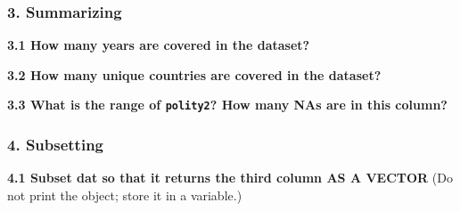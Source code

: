 \documentclass[]{book}
\newenvironment{Shaded}{\begin{snugshade}}{\end{snugshade}}
\newcommand{\CommentTok}[1]{\textcolor[rgb]{0.56,0.35,0.01}{\textit{#1}}}
\newcommand{\DecValTok}[1]{\textcolor[rgb]{0.00,0.00,0.81}{#1}}
\newcommand{\KeywordTok}[1]{\textcolor[rgb]{0.13,0.29,0.53}{\textbf{#1}}}
\newcommand{\NormalTok}[1]{#1}
\newcommand{\OperatorTok}[1]{\textcolor[rgb]{0.81,0.36,0.00}{\textbf{#1}}}
\newcommand{\StringTok}[1]{\textcolor[rgb]{0.31,0.60,0.02}{#1}}
\begin{document}
\hypertarget{summarizing}{%
\subsubsection*{3. Summarizing}\label{summarizing}}

\textbf{3.1 How many years are covered in the dataset?}

\begin{Shaded}
\end{Shaded}

\textbf{3.2 How many unique countries are covered in the dataset?}

\begin{Shaded}
\end{Shaded}

\textbf{3.3 What is the range of \texttt{polity2}? How many NAs are in this column?}

\begin{Shaded}
\end{Shaded}

\hypertarget{subsetting-1}{%
\subsubsection*{4. Subsetting}\label{subsetting-1}}

\textbf{4.1 Subset dat so that it returns the third column AS A VECTOR} (Do not print the object; store it in a variable.)

\begin{Shaded}
\end{Shaded}
\end{document}
